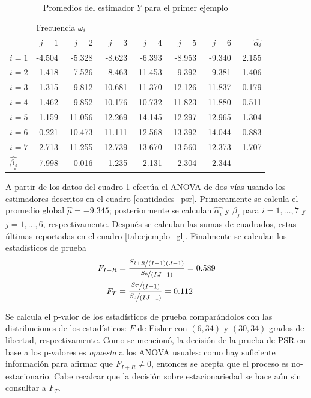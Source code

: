 \documentclass[12pt,letterpaper]{book}
\begin{document}
\begin{table}
\caption{Promedios del estimador $Y$ para el primer ejemplo}
\centering
\begin{tabular}{lrrrrrrr}
\toprule
      & \multicolumn{6}{l}{Frecuencia $\omega_i$} \\
\cmidrule{2-7}
      & $j=1$  & $j=2$   & $j=3$   & $j=4$   & $j=5$   & $j=6$   & $\widehat{\alpha_i}$ \\ 
\midrule
$i=1$ & -4.504 & -5.328  & -8.623  & -6.393  & -8.953  & -9.340  & 2.155  \\
$i=2$ & -1.418 & -7.526  & -8.463  & -11.453 & -9.392  & -9.381  & 1.406  \\
$i=3$ & -1.315 & -9.812  & -10.681 & -11.370 & -12.126 & -11.837 & -0.179 \\
$i=4$ & 1.462  & -9.852  & -10.176 & -10.732 & -11.823 & -11.880 & 0.511  \\
$i=5$ & -1.159 & -11.056 & -12.269 & -14.145 & -12.297 & -12.965 & -1.304 \\
$i=6$ & 0.221  & -10.473 & -11.111 & -12.568 & -13.392 & -14.044 & -0.883 \\
$i=7$ & -2.713 & -11.255 & -12.739 & -13.670 & -13.560 & -12.373 & -1.707 \\
$\widehat{\beta_j}$
      & 7.998  & 0.016   & -1.235  & -2.131  & -2.304  & -2.344  &         \\ 
\bottomrule
\end{tabular}
\label{tab:valores_psr}
\end{table}

A partir de los datos del cuadro \ref{tab:valores_psr} efectúa el ANOVA de dos vías usando los estimadores descritos en el cuadro \ref{cantidades_psr}.
%
Primeramente se calcula el promedio global $\widehat{\mu} = -9.345$; posteriormente se calculan $\widehat{\alpha_i}$ y $\beta_j$ para $i=1,\dots, 7$ y $j=1,\dots, 6$, respectivamente. 
%
Después se calculan las sumas de cuadrados, estas últimas reportadas en el cuadro \ref{tab:ejemplo_gl}.
%
Finalmente se calculan los estadísticos de prueba
\begin{align}
F_{I+R} &= \frac{\nicefrac{S_{I+R}}{(I-1)(J-1)}}{\nicefrac{S_0}{(IJ-1)}} = 0.589 \\
F_{T} &= \frac{\nicefrac{S_{T}}{(I-1)}}{\nicefrac{S_0}{(IJ-1)}} = 0.112
\end{align}

Se calcula el p-valor de los estadísticos de prueba comparándolos con las distribuciones de los estadísticos: $F$ de Fisher con $(6,34)$ y $(30,34)$ grados de libertad, respectivamente.
%
Como se mencionó, la decisión de la prueba de PSR en base a los p-valores es \textit{opuesta} a los ANOVA usuales: como hay suficiente información para afirmar que $F_{I+R} \neq 0$, entonces se acepta que el proceso es no-estacionario.
%
Cabe recalcar que la decisión sobre estacionariedad se hace aún sin consultar a $F_T$.
\end{document}

